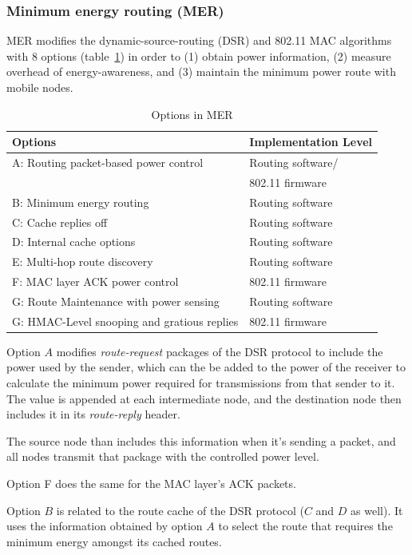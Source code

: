 \subsubsection{Minimum energy routing (MER)}
MER\cite{doshi2002demand} modifies the dynamic-source-routing (DSR)\cite{johnson1996dynamic}
and 802.11 MAC algorithms\cite{woesner1998power} with 8 options (table~\ref{tbl:mer-options}) in order to
(1) obtain power information, (2) measure overhead of energy-awareness, and
(3) maintain the minimum power route with mobile nodes.

\begin{table}[tb]
  \begin{tabular}{ll}
    Options & Implementation Level  \\
    \hline
    A: Routing packet-based power control & Routing software/\\ &802.11 firmware \\
    B: Minimum energy routing & Routing software \\
    C: Cache replies off & Routing software \\
    D: Internal cache options & Routing software \\
    E: Multi-hop route discovery & Routing software \\
    F: MAC layer ACK power control & 802.11 firmware \\
    G: Route Maintenance with power sensing & Routing software \\
    G: HMAC-Level snooping and gratious replies & 802.11 firmware \\
  \end{tabular}
  \caption{Options in MER}
  \label{tbl:mer-options}
\end{table}

Option $A$ modifies \textit{route-request} packages of the DSR protocol to
include the power used by the sender, which can the be added to the power
of the receiver to calculate the minimum power required for transmissions
from that sender to it. The value is appended at each intermediate node, and the
destination node then includes it in its \textit{route-reply} header.

The source node than includes this information when it's sending a packet, and
all nodes transmit that package with the controlled power level.

Option F does the same for the MAC layer's ACK packets.

Option $B$ is related to the route cache of the DSR protocol ($C$ and $D$ as well). It
uses the information obtained by option $A$ to select the route that requires
the minimum energy amongst its cached routes.

